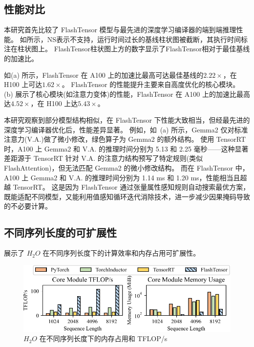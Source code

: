 \subsection{性能对比}

本研究首先比较了 FlashTensor 模型与最先进的深度学习编译器的端到端推理性能。
如所示，NS表示不支持，运行时间过长的基线柱状图被截断，其执行时间标注在柱状图上。
FlashTensor柱状图上方的数字显示了FlashTensor相对于最佳基线的加速比。

如(a) 所示，FlashTensor 在 A100 上的加速比最高可达最佳基线的\(2.22\times\)，在 H100 上可达\(1.62\times\)。
FlashTensor 的性能提升主要来自高度优化的核心模块。
(b) 展示了核心模块(如注意力变体)的性能，FlashTensor 在 A100 上的加速比最高达\(4.52\times\)，在 H100 上达\(5.43\times\)。

本研究观察到部分模型结构相似，在 FlashTensor 下性能大致相当，但经最先进的深度学习编译器优化后，性能差异显著。
例如，如~(a) 所示，Gemma2 仅对标准注意力(V.A.)做了微小修改，绿色算子为 Gemma2 的额外结构。
使用 TensorRT 时，A100 上 Gemma2 和 V.A. 的推理时间分别为 5.13 和 2.25 毫秒——这种显著差距源于 TensorRT 针对 V.A. 的注意力结构预写了特定规则(类似 FlashAttention)，但无法匹配 Gemma2 的微小修改结构。
而在 FlashTensor 中，A100 上 Gemma2 和 V.A. 的推理时间分别为 1.14 ms 和 1.20 ms，性能相当且超越 TensorRT。
这是因为 FlashTensor 通过张量属性感知规则自动搜索最优方案，既能适配不同模型，又能利用值感知循环迭代消除技术，进一步减少因果掩码导致的不必要计算。

\subsection{不同序列长度的可扩展性}
 展示了 \(H_{2}O\) 在不同序列长度下的计算效率和内存占用可扩展性。  
\begin{figure}[ht]
    \centering
    \includegraphics[width=0.7\linewidth]{figures/flashtensor/gflops_mem-crop.pdf}
    \caption{\(H_{2}O\) 在不同序列长度下的内存占用和 TFLOP/s}
    \label{fig:seqlen_mem_flops}
\end{figure}

